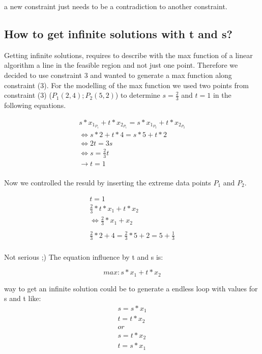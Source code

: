 \documentclass[%
   10pt,              %
   nenglish,           %
   a4paper,           %
   DIV11,             %
]{scrartcl}%
\begin{document}
\noindent a new constraint just needs to be a contradiction to another constraint.
	
\subsection*{How to get infinite solutions with t and s?}

Getting infinite solutions,  requires to describe with the max function of a linear algorithm a line in the feasible region and not just one point.
Therefore we decided to use constraint 3 and wanted to generate a max function along constraint (3). For the modelling of the max function we used two points from constraint (3) ($P_1(2,4); P_2(5,2)$) to determine $s=\frac{2}{3}$ and $t=1$ in the following equations.

\begin{eqnarray*}
	s * x_{1_{P_1}} + t*x_{2_{P_1}} = s * x_{1_{P_2}} + t*x_{2_{P_2}}\\
\Leftrightarrow	s*2+t*4 = s*5+ t*2\\
\Leftrightarrow	2t = 3s\\
\Leftrightarrow	s = \frac{2}{3}t\\
\rightarrow t=1\\	
\end{eqnarray*}

Now we controlled the resuld by inserting the extreme data points $P_1$ and $P_2$.


\begin{eqnarray*}
t=1\\
\frac{2}{3}*t*x_1+t*x_2\\
\Leftrightarrow\frac{2}{3}*x_1+x_2\\
\\
\frac{2}{3}*2+4 =\frac{2}{3}*5+2  = 5+\frac{1}{3}\\
\end{eqnarray*}


Not serious ;)
The equation influence by t and s is:

\begin{equation*}
max: s*x_1+t*x_2
\end{equation*}

\noindent way to get an infinite solution could be to generate a endless loop with values for s and t like:
\begin{eqnarray*}
s=s*x_1\label{inf1}\\ 
t=t*x_2 \label{inf2}\\ 
or\\
s=t*x_2\label{inf3}\\ 
t=s*x_1 \label{inf4}\\ 
\end{eqnarray*}
\end{document}
